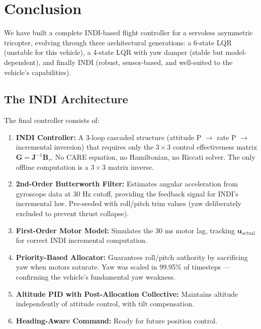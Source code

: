 \documentclass[12pt, a4paper]{article}
\newcommand{\bu}{\bm{u}}
\newcommand{\bJ}{\bm{J}}
\newcommand{\bB}{\bm{B}}
\begin{document}
\section{Conclusion}

We have built a complete INDI-based flight controller for a servoless asymmetric tricopter, evolving through three architectural generations: a 6-state LQR (unstable for this vehicle), a 4-state LQR with yaw damper (stable but model-dependent), and finally INDI (robust, sensor-based, and well-suited to the vehicle's capabilities).

\subsection{The INDI Architecture}

The final controller consists of:

\begin{enumerate}
    \item \textbf{INDI Controller:}  A 3-loop cascaded structure (attitude P $\to$ rate P $\to$ incremental inversion) that requires only the $3 \times 3$ control effectiveness matrix $\bm{G} = \bJ^{-1}\bB_\tau$.  No CARE equation, no Hamiltonian, no Riccati solver.  The only offline computation is a $3 \times 3$ matrix inverse.

    \item \textbf{2nd-Order Butterworth Filter:}  Estimates angular acceleration from gyroscope data at 30 Hz cutoff, providing the feedback signal for INDI's incremental law.  Pre-seeded with roll/pitch trim values (yaw deliberately excluded to prevent thrust collapse).

    \item \textbf{First-Order Motor Model:}  Simulates the 30 ms motor lag, tracking $\bu_{\text{actual}}$ for correct INDI incremental computation.

    \item \textbf{Priority-Based Allocator:}  Guarantees roll/pitch authority by sacrificing yaw when motors saturate.  Yaw was scaled in 99.95\% of timesteps --- confirming the vehicle's fundamental yaw weakness.

    \item \textbf{Altitude PID with Post-Allocation Collective:}  Maintains altitude independently of attitude control, with tilt compensation.

    \item \textbf{Heading-Aware Command:}  Ready for future position control.
\end{enumerate}
\end{document}
